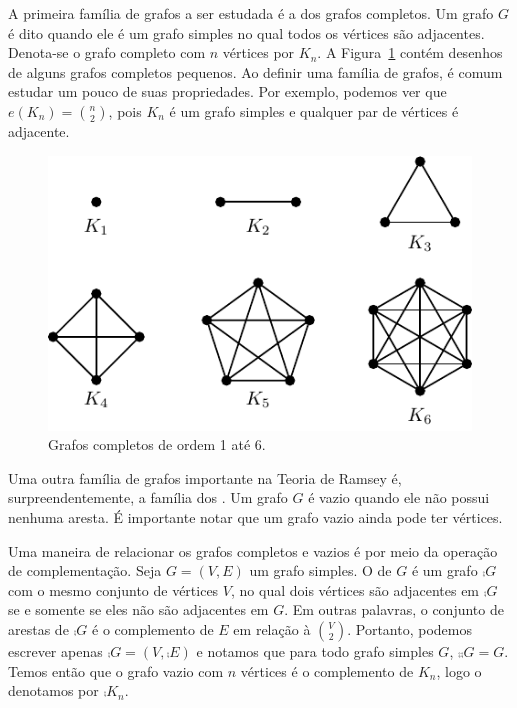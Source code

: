 A primeira família de grafos a ser estudada é a dos grafos completos. Um grafo $G$ é dito   quando ele é um grafo simples no qual todos os vértices são adjacentes. Denota-se o grafo completo com $n$ vértices por $K_n$. A Figura~\ref{fig:intro:complete} contém desenhos de alguns grafos completos pequenos. Ao definir uma família de grafos, é comum estudar um pouco de suas propriedades. Por exemplo, podemos ver que $e(K_n) = \binom{n}{2}$, pois $K_n$ é um grafo simples e qualquer par de vértices é adjacente.

\begin{figure}[ht!]
\centering
\includegraphics{figures/1_intro_3_complete}
\caption{Grafos completos de ordem 1 até 6.}
\label{fig:intro:complete}
\end{figure}

Uma outra família de grafos importante na Teoria de Ramsey é, surpreendentemente, a família dos . Um grafo $G$ é vazio quando ele não possui nenhuma aresta. É importante notar que um grafo vazio ainda pode ter vértices.

Uma maneira de relacionar os grafos completos e vazios é por meio da operação de complementação. Seja $G = (V,E)$ um grafo simples. O  de $G$ é um grafo $\comp{G}$ com o mesmo conjunto de vértices $V$, no qual dois vértices são adjacentes em $\comp{G}$ se e somente se eles não são adjacentes em $G$. Em outras palavras, o conjunto de arestas de $\comp{G}$ é o complemento de $E$ em relação à $\binom{V}{2}$.
Portanto, podemos escrever apenas $\comp{G} = (V,\comp{E})$ e notamos que para todo grafo simples $G$, $\comp{\comp{G}} = G$. Temos então que o grafo vazio com $n$ vértices é o complemento de $K_n$, logo o denotamos por $\comp{K_n}$.

